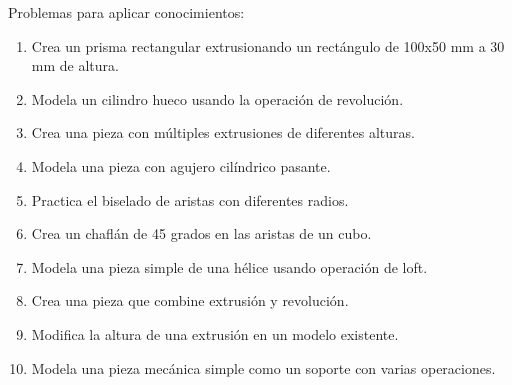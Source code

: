 Problemas para aplicar conocimientos:
\begin{enumerate}
	\item Crea un prisma rectangular extrusionando un
	      rectángulo de 100x50 mm a 30 mm de altura.
	\item Modela un cilindro hueco usando la operación
	      de revolución.
	\item Crea una pieza con múltiples extrusiones de
	      diferentes alturas.
	\item Modela una pieza con agujero cilíndrico pasante.
	\item Practica el biselado de aristas con diferentes
	      radios.
	\item Crea un chaflán de 45 grados en las aristas
	      de un cubo.
	\item Modela una pieza simple de una hélice usando
	      operación de loft.
	\item Crea una pieza que combine extrusión y
	      revolución.
	\item Modifica la altura de una extrusión en un modelo
	      existente.
	\item Modela una pieza mecánica simple como un soporte
	      con varias operaciones.
\end{enumerate}